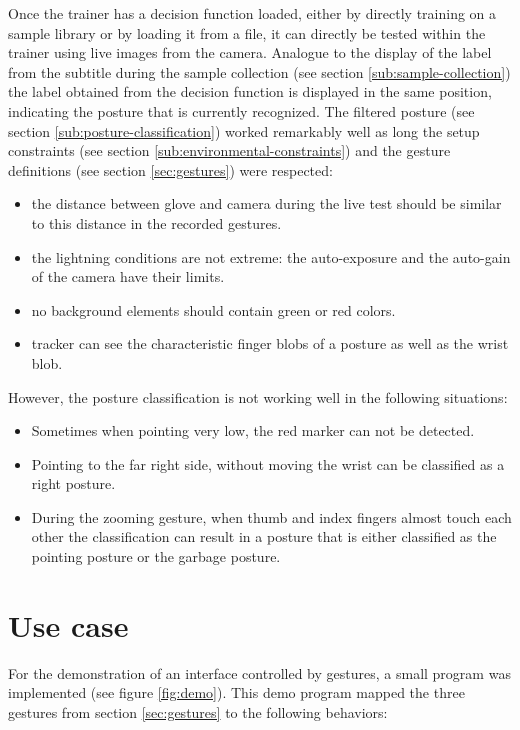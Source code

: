Once the trainer has a decision function loaded, either by directly training on a sample library or by loading it from a file, it can directly be tested within the trainer using live images from the camera. Analogue to the display of the label from the subtitle during the sample collection (see section \ref{sub:sample-collection}) the label obtained from the decision function is displayed in the same position, indicating the posture that is currently recognized. The filtered posture (see section \ref{sub:posture-classification}) worked remarkably well as long the setup constraints (see section \ref{sub:environmental-constraints}) and the gesture definitions (see section \ref{sec:gestures}) were respected:

\begin{itemize}
\item the distance between glove and camera during the live test should be similar to this distance in the recorded gestures.
\item the lightning conditions are not extreme: the auto-exposure and the auto-gain of the camera have their limits.
\item no background elements should contain green or red colors.
\item tracker can see the characteristic finger blobs of a posture as well as the wrist blob.
\end{itemize}

However, the posture classification is not working well in the following situations:
\begin{itemize}
\item Sometimes when pointing very low, the red marker can not be detected.
\item Pointing to the far right side, without moving the wrist can be classified as a right posture.
\item During the zooming gesture, when thumb and index fingers almost touch each other the classification can result in a posture that is either classified as the pointing posture or the garbage posture.
\end{itemize}

\section{Use case}
\label{sec:use-case}

For the demonstration of an interface controlled by gestures, a small program was implemented (see figure \ref{fig:demo}). This demo program mapped the three gestures from section \ref{sec:gestures} to the following behaviors:

